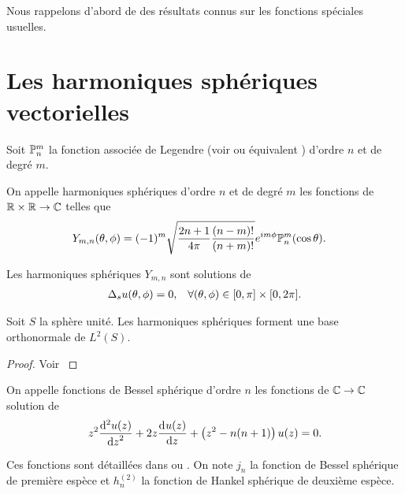 Nous rappelons d'abord de \cite{nedelec_acoustic_2001} des résultats connus sur les fonctions spéciales usuelles.

\section{Les harmoniques sphériques vectorielles}

    \begin{defn}
        \label{def:sphere:harmoniques_spheriques}
        Soit \(\PP^m_n\) la fonction associée de Legendre (voir \cite[Chapitre.~8]{abramowitz_handbook_1964} ou équivalent \cite[\url{https://dlmf.nist.gov/14}]{dlmf_nist_2019}) d'ordre \(n\) et de degré \(m\). 

        On appelle harmoniques sphériques d'ordre \(n\) et de degré \(m\) les fonctions de \(\RR\times\RR \rightarrow \CC\) telles que
        \begin{align*}
            Y_{m,n}(\tp) &= (-1)^m\sqrt{\frac{2n+1}{4\pi}\frac{(n-m)!}{(n+m)!}}e^{im\phi}\PP^m_n(\cos \theta).
        \end{align*}
    \end{defn}

    \begin{prop}
        Les harmoniques sphériques \(Y_{m,n}\) sont solutions de 
        \begin{align*}
            \lapls{} u(\tp) = 0, && \forall (\tp) \in [0,\pi]\times[0,2\pi].
        \end{align*}
    \end{prop}
    \begin{prop}
        Soit \(S\) la sphère unité. Les harmoniques sphériques forment une base orthonormale de \(L^2(S)\).
    \end{prop}
    \begin{proof}
        Voir \cite[p.~14]{nedelec_acoustic_2001}
    \end{proof}

    \begin{defn}
        \label{def:sphere:bessel_spheriques}
        On appelle fonctions de Bessel sphérique d'ordre \(n\) les fonctions de \(\CC \rightarrow \CC\) solution de
        \begin{align*}
            z^{2}\ddp[2]{z}{u(z)}+2z\ddp{z}{u(z)}+\left(z^{2}-n(n+1)\right)u(z)=0.
        \end{align*}
    \end{defn}
    Ces fonctions sont détaillées dans \cite[p.~437]{abramowitz_handbook_1964} ou \cite[\url{https://dlmf.nist.gov/10.47}]{dlmf_nist_2019}.
    On note \(j_n\) la fonction de Bessel sphérique de première espèce et \(h^{(2)}_n\) la fonction de Hankel sphérique de deuxième espèce.

